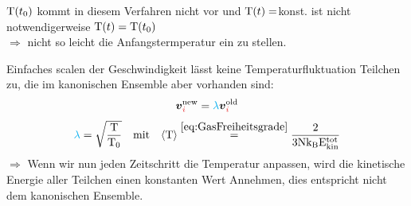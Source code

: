 \begin{notebox}[Probleme]\nospacing
  \begin{numberlist}
      \item 
        $\mathrm{T}(t_0)$ kommt in diesem Verfahren nicht vor und $\mathrm{T}(t)=$konst. ist nicht notwendigerweise $\mathrm{T}(t)=\mathrm{T}(t_0)$\\
        $\Rightarrow$ nicht so leicht die Anfangstermperatur ein zu stellen.
      \item Einfaches scalen der Geschwindigkeit lässt keine Temperaturfluktuation  Teilchen zu, die im kanonischen Ensemble aber vorhanden sind:
        \begin{align*}
          \vveci^{\text{new}}=\lambdac\vveci^{\text{old}}
        \end{align*}
        \begin{align*}
          \lambdac=\sqrt{\frac{\Tz}{\Tz_0}}&&\text{mit}&&\obs{\Tz}\eqs{\cref{eq:GasFreiheitsgrade}}\frac{2}{3\Nz\kb\Ez_{\text{kin}}^{\text{tot}}} 
        \end{align*}
        $\Rightarrow$ Wenn wir nun jeden Zeitschritt die Temperatur anpassen, wird die kinetische Energie aller Teilchen einen konstanten Wert Annehmen, dies entspricht nicht dem
        kanonischen Ensemble.
  \end{numberlist}
\end{notebox}
